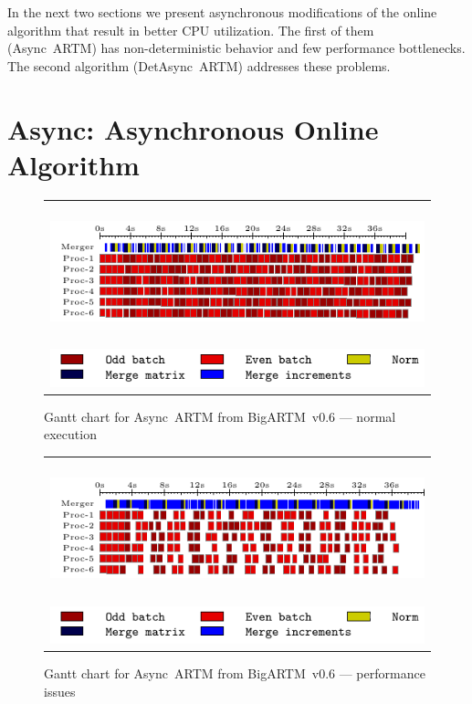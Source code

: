\documentclass[russian,english]{llncs}
\newcommand{\kw}[1]{\mbox{\textsf{#1}}}
\begin{document}
In the next two sections we present asynchronous modifications of the online algorithm that result in better CPU utilization.
The first of them (\kw{Async~ARTM}) has non-deterministic behavior and few performance bottlenecks.
The second algorithm (\kw{DetAsync~ARTM}) addresses these problems.

\section{Async: Asynchronous Online Algorithm}
\label{sec:AsyncARTM}

\begin{figure}[h]
	\centering
	\begin{tabular}{c}
		\includegraphics[height=4cm, width=12cm]{plots/old.pdf} \\
		\includegraphics[scale=1]{plots/legend_old.pdf}
	\end{tabular}
	\caption{Gantt chart for \kw{Async ARTM} from \kw{BigARTM v0.6} --- normal execution} \label{fig:gantt:AsyncARTM}
\end{figure}

\begin{figure}[h]
	\centering
	\begin{tabular}{c}
		\includegraphics[height=4cm, width=12cm]{plots/old_slow.pdf} \\
		\includegraphics[scale=1]{plots/legend_old.pdf}
	\end{tabular}
	\caption{Gantt chart for \kw{Async ARTM} from \kw{BigARTM v0.6} --- performance issues} \label{fig:gantt:AsyncARTM:slow}
\end{figure}
\end{document}
